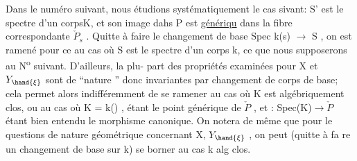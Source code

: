 Dans le numéro suivant, nous étudions systématiquement le cas
sivant: S' est le spectre d'un corpsK, et son image dahs P est \uline{génériqu}
dans la fibre correspondante $\check{P}_s$ . Quitte à faire le changement de base
Spec k(s) $\longrightarrow$ S , on est ramené pour ce au cas où S est le spectre
d'un corps k, ce que nous supposerons au N\textsuperscript{o} suivant. D'ailleurs, la plu-%
part des propriétés examinées pour X et $Y_{\hand{\xi}}$ sont de ``nature ''
donc invariantes par changement de corps de base; cela permet alors
indifféremment de se ramener au cas où K est algébriquement clos, ou au
cas où K = k(\hand{$\eta$}) , \hand{$\eta$} étant le point générique de $\check{P}$ , et \hand{$\xi$} : Spec(K)$\to\check{P}$
étant bien entendu le morphisme canonique. On notera de même que pour le
questions de nature géométrique concernant X, $Y_{\hand{\xi}}$ , on peut (quitte à fa
re un changement de base sur k) se borner au cas k alg clos.

